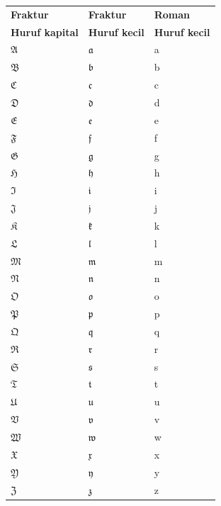 \begin{center}
{\renewcommand{\arraystretch}{1.10}%
\begin{tabularx}{\textwidth}{@{}>{\centering\arraybackslash}X>{\centering\arraybackslash}X>{\centering\arraybackslash}X@{}}
\hline
\textbf{Fraktur} & \textbf{Fraktur} & \textbf{Roman} \\
\textbf{Huruf kapital} & \textbf{Huruf kecil} & \textbf{Huruf kecil} \\
\hline
$\mathfrak A$ & $\mathfrak a$ & a \\
$\mathfrak B$ & $\mathfrak b$ & b \\
$\mathfrak C$ & $\mathfrak c$ & c \\
$\mathfrak D$ & $\mathfrak d$ & d \\
$\mathfrak E$ & $\mathfrak e$ & e \\
$\mathfrak F$ & $\mathfrak f$ & f \\
$\mathfrak G$ & $\mathfrak g$ & g \\
$\mathfrak H$ & $\mathfrak h$ & h \\
$\mathfrak I$ & $\mathfrak i$ & i \\
$\mathfrak J$ & $\mathfrak j$ & j \\
$\mathfrak K$ & $\mathfrak k$ & k \\
$\mathfrak L$ & $\mathfrak l$ & l \\
$\mathfrak M$ & $\mathfrak m$ & m \\
$\mathfrak N$ & $\mathfrak n$ & n \\
$\mathfrak O$ & $\mathfrak o$ & o \\
$\mathfrak P$ & $\mathfrak p$ & p \\
$\mathfrak Q$ & $\mathfrak q$ & q \\
$\mathfrak R$ & $\mathfrak r$ & r \\
$\mathfrak S$ & $\mathfrak s$ & s \\
$\mathfrak T$ & $\mathfrak t$ & t \\
$\mathfrak U$ & $\mathfrak u$ & u \\
$\mathfrak V$ & $\mathfrak v$ & v \\
$\mathfrak W$ & $\mathfrak w$ & w \\
$\mathfrak X$ & $\mathfrak x$ & x \\
$\mathfrak Y$ & $\mathfrak y$ & y \\
$\mathfrak Z$ & $\mathfrak z$ & z \\
\hline
\end{tabularx}}
\end{center}


